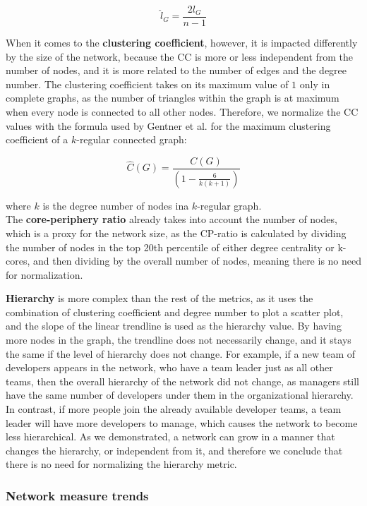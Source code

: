 \[ \hat{l}_G = \frac{2l_G}{n-1} \]

When it comes to the \textbf{clustering coefficient}, however, it is impacted differently by the size of the network, because the CC is more or less independent from the number of nodes, and it is more related to the number of edges and the degree number. The clustering coefficient takes on its maximum value of $1$ only in complete graphs, as the number of triangles within the graph is at maximum when every node is connected to all other nodes. Therefore, we normalize the CC values with the formula used by Gentner et al. \cite{gentnerLargeValuesClustering2016} for the maximum clustering coefficient of a $k$-regular connected graph:

\[ \hat{C}(G) = \frac{C(G)}{(1-\frac{6}{k(k+1)})}\]

where $k$ is the degree number of nodes ina $k$-regular graph. \\

The \textbf{core-periphery ratio} already takes into account the number of nodes, which is a proxy for the network size, as the CP-ratio is calculated by dividing the number of nodes in the top 20th percentile of either degree centrality or k-cores, and then dividing by the overall number of nodes, meaning there is no need for normalization.

\textbf{Hierarchy} is more complex than the rest of the metrics, as it uses the combination of clustering coefficient and degree number to plot a scatter plot, and the slope of the linear trendline is used as the hierarchy value. By having more nodes in the graph, the trendline does not necessarily change, and it stays the same if the level of hierarchy does not change. For example, if a new team of developers appears in the network, who have a team leader just as all other teams, then the overall hierarchy of the network did not change, as managers still have the same number of developers under them in the organizational hierarchy. In contrast, if more people join the already available developer teams, a team leader will have more developers to manage, which causes the network to become less hierarchical. As we demonstrated, a network can grow in a manner that changes the hierarchy, or independent from it, and therefore we conclude that there is no need for normalizing the hierarchy metric.

\subsubsection{Network measure trends}

